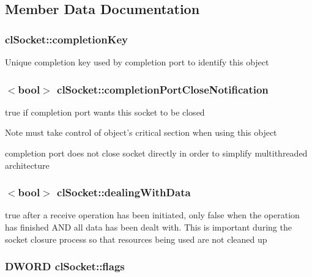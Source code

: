 \subsection{Member Data Documentation}
\hypertarget{classcl_socket_a13f7fb8c9c146df5b8b63a861b1d9b05}{
\subsubsection[{completionKey}]{ {\bf clSocket::completionKey}}}
\label{classcl_socket_a13f7fb8c9c146df5b8b63a861b1d9b05}
Unique completion key used by completion port to identify this object \hypertarget{classcl_socket_ae17183becacd182ade36644e561c1aca}{
\subsubsection[{completionPortCloseNotification}]{$<$bool$>$ {\bf clSocket::completionPortCloseNotification}}}
\label{classcl_socket_ae17183becacd182ade36644e561c1aca}
true if completion port wants this socket to be closed \begin{DoxyNote}{Note}
must take control of object's critical section when using this object 

completion port does not close socket directly in order to simplify multithreaded architecture 
\end{DoxyNote}
\hypertarget{classcl_socket_a119bea012ab04183f3a796a295438bd2}{
\subsubsection[{dealingWithData}]{$<$bool$>$ {\bf clSocket::dealingWithData}}}
\label{classcl_socket_a119bea012ab04183f3a796a295438bd2}
true after a receive operation has been initiated, only false when the operation has finished AND all data has been dealt with. This is important during the socket closure process so that resources being used are not cleaned up \hypertarget{classcl_socket_a3d6b17db1b4743a14efcf02205113ae8}{
\subsubsection[{flags}]{\setlength{\rightskip}{0pt plus 5cm}DWORD {\bf clSocket::flags}}}
